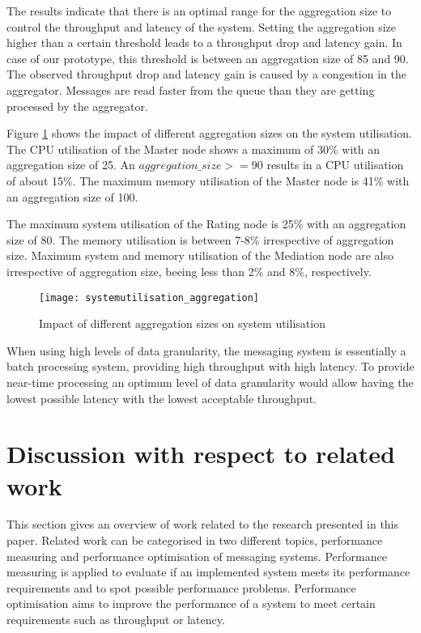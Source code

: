 The results indicate that there is an optimal range for the aggregation size to control the throughput and latency of the system. Setting the aggregation size higher than a certain threshold leads to a throughput drop and latency gain. In case of our prototype, this threshold is between an aggregation size of 85 and 90. The observed throughput drop and latency gain is caused by a congestion in the aggregator. Messages are read faster from the queue than they are getting processed by the aggregator.

Figure \ref{fig:ch4_systemutilisation_aggregation} shows the impact of different aggregation sizes on the system utilisation. The CPU utilisation of the Master node shows a maximum of 30\% with an aggregation size of 25. An $aggregation\_size >= 90$ results in a CPU utilisation of about 15\%. The maximum memory utilisation of the Master node is 41\% with an aggregation size of 100.

The maximum system utilisation of the Rating node is 25\% with an aggregation size of 80. The memory utilisation is between 7-8\% irrespective of aggregation size. Maximum system and memory utilisation of the Mediation node are also irrespective of aggregation size, beeing less than 2\% and 8\%, respectively.

\begin{figure}[htbp]
	\centering
	\texttt{[image: systemutilisation\_aggregation]}
	\caption{Impact of different aggregation sizes on system utilisation}
	\label{fig:ch4_systemutilisation_aggregation}
\end{figure}

When using high levels of data granularity, the messaging system is essentially a batch processing system, providing high throughput with high latency. To provide near-time processing an optimum level of data granularity would allow having the lowest possible latency with the lowest acceptable throughput.

\section{Discussion with respect to related work}\label{sec:ch4_related_work}
This section gives an overview of work related to the research presented in this paper. Related work can be categorised in two different topics, performance measuring and performance optimisation of messaging systems. Performance measuring is applied to evaluate if an implemented system meets its performance requirements and to spot possible performance problems. Performance optimisation aims to improve the performance of a system to meet certain requirements such as throughput or latency.

